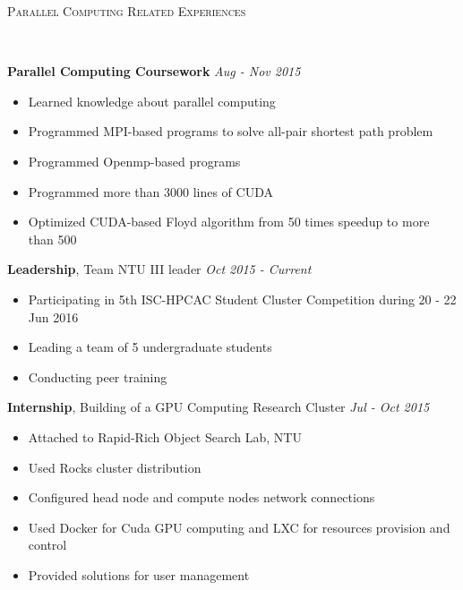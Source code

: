 \documentclass[a4paper, 12pt]{article}
\newenvironment{changemargin}[2]{%
  \begin{list}{}{%
      \setlength{\topsep}{0pt}%
      \setlength{\leftmargin}{#1}%
      \setlength{\rightmargin}{#2}%
      \setlength{\listparindent}{\parindent}%
      \setlength{\itemindent}{\parindent}%
      \setlength{\parsep}{\parskip}%
    }%
  \item[]}{\end{list}
}
\newcommand{\lineover}{
  \begin{changemargin}{-0.05in}{-0.05in}
    \vspace*{-8pt}
    \hrulefill \\
    \vspace*{-2pt}
  \end{changemargin}
}
\newcommand{\header}[1]{
  \begin{changemargin}{-0.5in}{-0.5in}
    \scshape{#1}\\
    \lineover
  \end{changemargin}
}
\newenvironment{body}
{
\vspace*{-16pt}
\begin{changemargin}{-0.25in}{-0.5in}
}	
{
\end{changemargin}
}
\begin{document}
\smallskip
\medskip
\header{Parallel Computing Related Experiences}
\begin{body}
  \vspace{14pt}

  \textbf{Parallel Computing Coursework} \hfill \emph{Aug - Nov 2015}\\
  \vspace*{-4pt}
  \begin{itemize} \itemsep -0pt  \small
  \item Learned knowledge about parallel computing
  \item Programmed MPI-based programs to solve all-pair shortest path problem
  \item Programmed Openmp-based programs
  \item Programmed more than 3000 lines of CUDA
  \item Optimized CUDA-based Floyd algorithm from 50 times speedup to more than 500
  \end{itemize}

  \textbf{Leadership}, {Team NTU III leader} \hfill \emph{Oct 2015 - Current}\\
  \vspace*{-4pt}
  \begin{itemize} \itemsep -0pt  \small
  \item Participating in 5th ISC-HPCAC Student Cluster Competition during 20 - 22 Jun 2016
  \item Leading a team of 5 undergraduate students
  \item Conducting peer training
  \end{itemize}

  \textbf{Internship}, {Building of a GPU Computing Research Cluster} \hfill \emph{Jul - Oct 2015}\\
  \vspace*{-4pt}
  \begin{itemize} \itemsep -0pt  \small
  \item Attached to Rapid-Rich Object Search Lab, NTU
  \item Used Rocks cluster distribution
  \item Configured head node and compute nodes network connections
  \item Used Docker for Cuda GPU computing and LXC for resources provision and control
  \item Provided solutions for user management
  \end{itemize}

\end{body}
\end{document}
